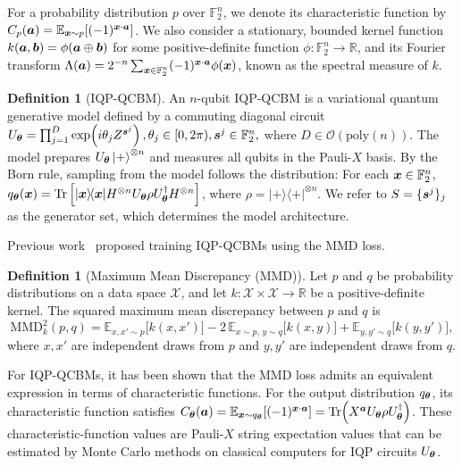 \documentclass{article}
\theoremstyle{plain}
\theoremstyle{definition}
\newtheorem{definition}[theorem]{Definition}
\theoremstyle{remark}
\begin{document}
For a probability distribution $p$ over $\mathbb{F}_2^n$, we denote its characteristic function by $C_p({\bm{a}}) = \mathbb{E}_{{\bm{x}} \sim p}[(-1)^{{\bm{x}}\cdot {\bm{a}}}]$. We also consider a stationary, bounded kernel function $k({\bm{a}}, {\bm{b}}) = \phi({\bm{a}}\oplus{\bm{b}})$ for some positive-definite function $\phi\colon \mathbb{F}_2^n \to \mathbb{R}$, and its Fourier transform $\Lambda({\bm{a}}) = 2^{-n}\sum_{{\bm{x}}\in\mathbb{F}_2^n} (-1)^{{\bm{x}} \cdot {\bm{a}}} \phi({\bm{x}}) $, known as the spectral measure of $k$.
\begin{definition}[IQP-QCBM]
\label{def:IQP}
An $n$-qubit IQP-QCBM is a variational quantum generative model defined by a commuting diagonal circuit
$U_{{\bm{\theta}}}
=
\prod_{j=1}^D \exp\!\left(i\theta_j Z^{{\bm{s}}^j}\right),
\theta_j \in [0,2\pi), {\bm{s}}^j \in \mathbb F_2^n,$
where $D \in \mathcal O(\mathrm{poly}(n))$. The model prepares
$U_{{\bm{\theta}}}\ket{+}^{\otimes n}$ and measures all qubits in the Pauli-$X$ basis.
By the Born rule, sampling from the model follows the distribution: For each ${\bm{x}} \in \mathbb{F}_2^n$, $
q_{{\bm{\theta}}}({\bm{x}})
=
\operatorname{Tr}
\left[
|{\bm{x}}\rangle\!\langle{\bm{x}}|
H^{\otimes n}
U_{{\bm{\theta}}}\rho U_{{\bm{\theta}}}^{\dagger}
H^{\otimes n}
\right]$, where $\rho = |+\rangle\!\langle+|^{\otimes n}$.
We refer to $S=\{{\bm{s}^j}\}_j$ as the generator set, which determines the model architecture.
\end{definition}

Previous work~\citet{recioarmengol25} proposed training IQP-QCBMs using the MMD loss. 

\begin{definition}[Maximum Mean Discrepancy (MMD)]
\label{def:mmd-kernel}
Let $p$ and $q$ be probability distributions on a data space $\mathcal{X}$, and let $k\colon\mathcal{X}\times\mathcal{X}\to\mathbb{R}$ be a positive-definite kernel. The squared maximum mean discrepancy between $p$ and $q$ is
\begin{equation}
\mathrm{MMD}_k^2(p,q)
=\mathbb{E}_{x,x'\sim p}\big[k(x,x')\big]
-2\,\mathbb{E}_{x\sim p,\,y\sim q}\big[k(x,y)\big]
+\mathbb{E}_{y,y'\sim q}\big[k(y,y')\big],
\end{equation}
where $x,x'$ are independent draws from $p$ and $y,y'$ are independent draws from $q$.
\end{definition}

For IQP-QCBMs, it has been shown that the MMD loss admits an equivalent expression in terms of characteristic functions. For the output distribution $q_{\bm{\theta}}$, its characteristic function satisfies $C_{\bm{\theta}}({\bm{a}})=\operatorname*{\mathbb{E}}_{{\bm{x}} \sim q_{\bm{\theta}}}[(-1)^{{\bm{x}} \cdot {\bm{a}}}]=\Tr(X^{{\bm{a}}}U_{\bm{\theta}}\rho U_{\bm{\theta}}^\dagger)$. These characteristic-function values are Pauli-$X$ string expectation values that can be estimated by Monte Carlo methods on classical computers for IQP circuits $U_{\bm{\theta}}$.
\end{document}
